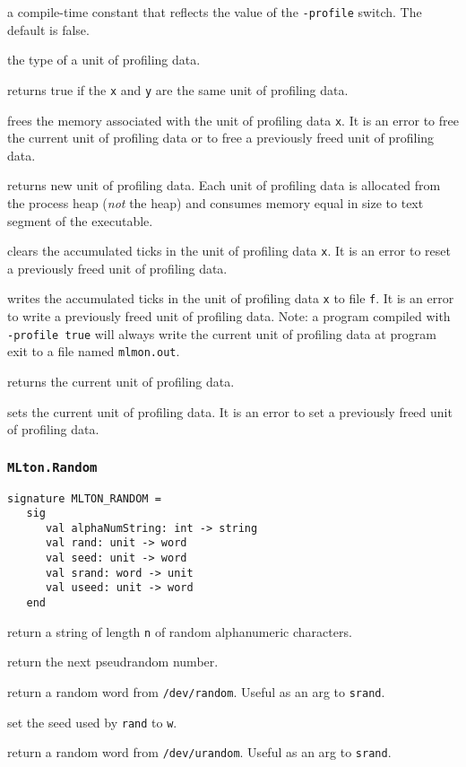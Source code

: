\begin{description}

a compile-time constant that reflects the value of the {\tt -profile} switch.
The default is false.

 the type of a unit of profiling data.

returns true if the {\tt x} and {\tt y} are the same unit of profiling
data.

frees the memory associated with the unit of profiling data {\tt x}.
It is an error to free the current unit of profiling data or to free a
previously freed unit of profiling data.

returns new unit of profiling data.  Each unit of profiling data is
allocated from the process heap (\emph{not} the {\mlton} heap) and
consumes memory equal in size to text segment of the executable.

clears the accumulated ticks in the unit of profiling data {\tt x}.
It is an error to reset a previously freed unit of profiling data.

writes the accumulated ticks in the unit of profiling data {\tt x} to
file {\tt f}.  It is an error to write a previously freed unit of
profiling data.  Note: a program compiled with {\tt -profile true}
will always write the current unit of profiling data at program exit
to a file named {\tt mlmon.out}.

returns the current unit of profiling data.

sets the current unit of profiling data.  It is an error to set a
previously freed unit of profiling data.  

\end{description}

\subsubsection{\tt MLton.Random}
\begin{verbatim}
signature MLTON_RANDOM =
   sig
      val alphaNumString: int -> string
      val rand: unit -> word
      val seed: unit -> word
      val srand: word -> unit
      val useed: unit -> word
   end
\end{verbatim}

\begin{description}
return a string of length {\tt n} of random alphanumeric characters.

return the next pseudrandom number.

return a random word from {\tt /dev/random}.  Useful as an arg to {\tt srand}.

set the seed used by {\tt rand} to {\tt w}.

return a random word from {\tt /dev/urandom}.  Useful as an arg to {\tt srand}.
\end{description}

